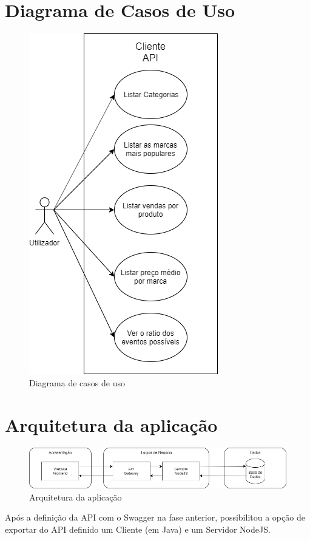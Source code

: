 \documentclass[runningheads]{llncs}
\begin{document}
\section{Diagrama de Casos de Uso}
\begin{figure}[H]
  \centering
  \includegraphics[scale=0.5]{Use_Cases.png}
  \caption{Diagrama de casos de uso}
\end{figure}

\section{Arquitetura da aplicação}
\begin{figure}[H]
  \centering
  \includegraphics[scale=0.4]{App_arc.png}
  \caption{Arquitetura da aplicação}
\end{figure}

Após a definição da API com o Swagger na fase anterior, possibilitou a opção de exportar do API definido um Cliente (em Java) e um Servidor NodeJS.
\end{document}
